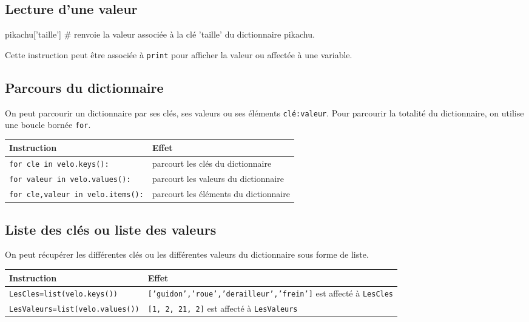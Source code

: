 \subsection*{Lecture d'une valeur}

\begin{python}
pikachu['taille'] \# renvoie la valeur associée à la clé 'taille' du dictionnaire pikachu.
\end{python}
Cette instruction peut être associée à \texttt{print} pour afficher la valeur ou affectée à une variable.

\subsection*{Parcours du dictionnaire}
On peut parcourir un dictionnaire par ses clés, ses valeurs ou ses éléments \texttt{clé:valeur}. Pour parcourir la totalité du dictionnaire, on utilise une boucle bornée \texttt{for}.


\begin{center}
\begin{tabular}{|l|p{7cm}|}\hline Instruction & Effet \\
\hline
\texttt {for cle in velo.keys():} & parcourt les clés du dictionnaire\\
\hline
\texttt {for valeur in velo.values():} & parcourt les valeurs du dictionnaire\\
\hline
\texttt {for cle,valeur in velo.items():} & parcourt les éléments du dictionnaire\\
\hline
\end{tabular}
\end{center}


\subsection*{Liste des clés ou liste des valeurs}
On peut récupérer les différentes clés ou les différentes valeurs du dictionnaire sous forme de liste.

\begin{center}
\begin{tabular}{|l|p{10cm}|}\hline Instruction & Effet \\
\hline
\texttt {LesCles=list(velo.keys())} & \texttt{['guidon','roue','derailleur','frein']} est affecté à \texttt{LesCles}\\
\hline
\texttt {LesValeurs=list(velo.values())} & \texttt{[1, 2, 21, 2]} est affecté à \texttt{LesValeurs}\\
\hline
\end{tabular}
\end{center}


